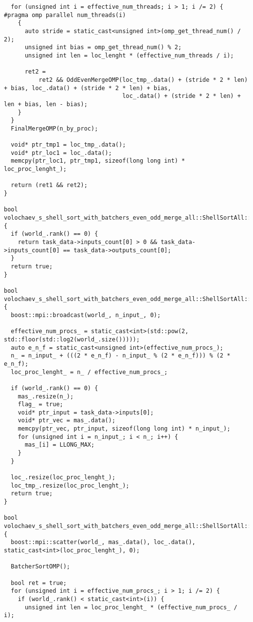 \documentclass[12pt]{article}
\begin{document}
\begin{lstlisting}
  for (unsigned int i = effective_num_threads; i > 1; i /= 2) {
#pragma omp parallel num_threads(i)
    {
      auto stride = static_cast<unsigned int>(omp_get_thread_num() / 2);
      unsigned int bias = omp_get_thread_num() % 2;
      unsigned int len = loc_lenght * (effective_num_threads / i);

      ret2 =
          ret2 && OddEvenMergeOMP(loc_tmp_.data() + (stride * 2 * len) + bias, loc_.data() + (stride * 2 * len) + bias,
                                  loc_.data() + (stride * 2 * len) + len + bias, len - bias);
    }
  }
  FinalMergeOMP(n_by_proc);

  void* ptr_tmp1 = loc_tmp_.data();
  void* ptr_loc1 = loc_.data();
  memcpy(ptr_loc1, ptr_tmp1, sizeof(long long int) * loc_proc_lenght_);

  return (ret1 && ret2);
}

bool volochaev_s_shell_sort_with_batchers_even_odd_merge_all::ShellSortAll::ValidationImpl() {
  if (world_.rank() == 0) {
    return task_data->inputs_count[0] > 0 && task_data->inputs_count[0] == task_data->outputs_count[0];
  }
  return true;
}

bool volochaev_s_shell_sort_with_batchers_even_odd_merge_all::ShellSortAll::PreProcessingImpl() {
  boost::mpi::broadcast(world_, n_input_, 0);

  effective_num_procs_ = static_cast<int>(std::pow(2, std::floor(std::log2(world_.size()))));
  auto e_n_f = static_cast<unsigned int>(effective_num_procs_);
  n_ = n_input_ + (((2 * e_n_f) - n_input_ % (2 * e_n_f))) % (2 * e_n_f);
  loc_proc_lenght_ = n_ / effective_num_procs_;

  if (world_.rank() == 0) {
    mas_.resize(n_);
    flag_ = true;
    void* ptr_input = task_data->inputs[0];
    void* ptr_vec = mas_.data();
    memcpy(ptr_vec, ptr_input, sizeof(long long int) * n_input_);
    for (unsigned int i = n_input_; i < n_; i++) {
      mas_[i] = LLONG_MAX;
    }
  }

  loc_.resize(loc_proc_lenght_);
  loc_tmp_.resize(loc_proc_lenght_);
  return true;
}

bool volochaev_s_shell_sort_with_batchers_even_odd_merge_all::ShellSortAll::RunImpl() {
  boost::mpi::scatter(world_, mas_.data(), loc_.data(), static_cast<int>(loc_proc_lenght_), 0);

  BatcherSortOMP();

  bool ret = true;
  for (unsigned int i = effective_num_procs_; i > 1; i /= 2) {
    if (world_.rank() < static_cast<int>(i)) {
      unsigned int len = loc_proc_lenght_ * (effective_num_procs_ / i);


\end{lstlisting}
\end{document}
